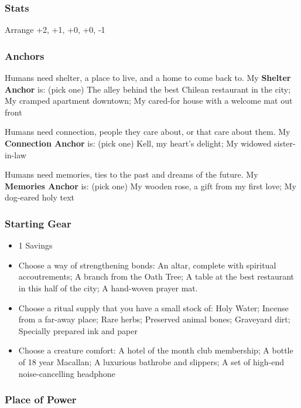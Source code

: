 \documentclass[
]{article}
\providecommand{\tightlist}{%
  \setlength{\itemsep}{0pt}\setlength{\parskip}{0pt}}
\begin{document}
\hypertarget{stats-5}{%
\subsubsection{Stats}\label{stats-5}}

Arrange +2, +1, +0, +0, -1

\hypertarget{anchors-4}{%
\subsubsection{Anchors}\label{anchors-4}}

Humans need shelter, a place to live, and a home to come back to. My
\textbf{Shelter Anchor} is: (pick one) The alley behind the best Chilean
restaurant in the city; My cramped apartment downtown; My cared-for
house with a welcome mat out front

Humans need connection, people they care about, or that care about them.
My \textbf{Connection Anchor} is: (pick one) Kell, my heart's delight;
My widowed sister-in-law

Humans need memories, ties to the past and dreams of the future. My
\textbf{Memories Anchor} is: (pick one) My wooden rose, a gift from my
first love; My dog-eared holy text

\hypertarget{starting-gear-4}{%
\subsubsection{Starting Gear}\label{starting-gear-4}}

\begin{itemize}
\tightlist
\item
  1 Savings
\item
  Choose a way of strengthening bonds: An altar, complete with spiritual
  accoutrements; A branch from the Oath Tree; A table at the best
  restaurant in this half of the city; A hand-woven prayer mat.
\item
  Choose a ritual supply that you have a small stock of: Holy Water;
  Incense from a far-away place; Rare herbs; Preserved animal bones;
  Graveyard dirt; Specially prepared ink and paper
\item
  Choose a creature comfort: A hotel of the month club membership; A
  bottle of 18 year Macallan; A luxurious bathrobe and slippers; A set
  of high-end noise-cancelling headphone
\end{itemize}

\hypertarget{place-of-power-2}{%
\subsubsection{Place of Power}\label{place-of-power-2}}
\end{document}
